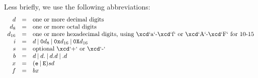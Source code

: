 Less briefly, we use the following abbreviations: 
\begin{displaymath}
\begin{array}{rcll}
d &=& \mbox{one or more decimal digits}\\
d_8 &=& \mbox{one or more octal digits}\\
d_{16} &=& \mbox{one or more hexadecimal digits, using \xcd`a`-\xcd`f`
or \xcd`A`-\xcd`F`
for 10-15}\\
i &=& d 
        \mathbin{|} {\tt 0} d_8 
        \mathbin{|} {\tt 0x} d_{16}
        \mathbin{|} {\tt 0X} d_{16}
\\
s &=& \mbox{optional \xcd`+` or \xcd`-`}\\
b &=& d 
          \mathbin{|} d {\tt .}
          \mathbin{|} d {\tt .} d
          \mathbin{|}  {\tt .} d \\
x &=& ({\tt e } \mathbin{|} {\tt E})
         s
         d \\
f &=& b x
\end{array}
\end{displaymath}

